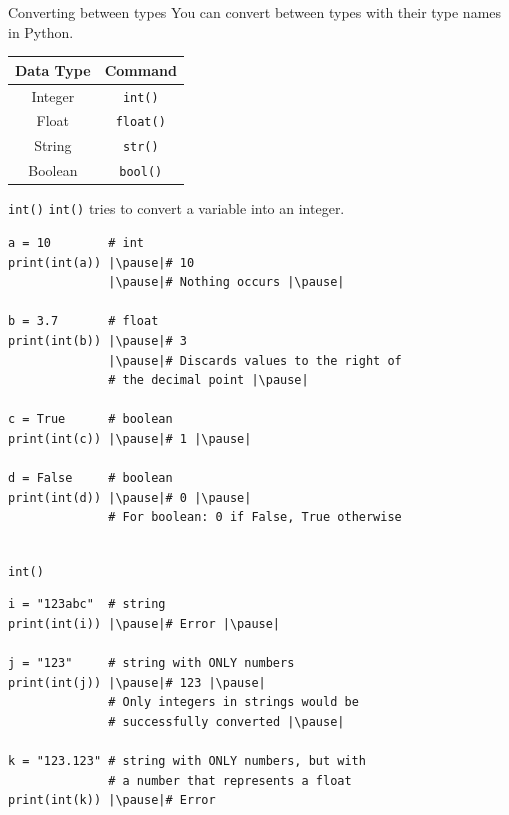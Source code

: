 \documentclass[dvipsnames, svgnames, x11names]{beamer}
\begin{document}
\begin{frame}{Converting between types}
You can convert between types with their type names in Python.
\begin{center}
	\begin{tabular}{|c|c|}\hline
		Data Type & Command\\\hline
		Integer & \texttt{int()}\\\hline
		Float & \texttt{float()}\\\hline
		String & \texttt{str()}\\\hline
		Boolean & \texttt{bool()}\\\hline
	\end{tabular}
\end{center}
\end{frame}

\begin{frame}[fragile]{\texttt{int()}}
\texttt{int()} tries to convert a variable into an integer.
\begin{verbatim} 
a = 10        # int
print(int(a)) |\pause|# 10
			  |\pause|# Nothing occurs |\pause|
			  
b = 3.7       # float
print(int(b)) |\pause|# 3
              |\pause|# Discards values to the right of 
              # the decimal point |\pause|
              
c = True      # boolean
print(int(c)) |\pause|# 1 |\pause|

d = False     # boolean
print(int(d)) |\pause|# 0 |\pause|
              # For boolean: 0 if False, True otherwise
              
\end{verbatim}
\end{frame}

\begin{frame}[fragile]{\texttt{int()}}
\begin{verbatim}
i = "123abc"  # string
print(int(i)) |\pause|# Error |\pause|

j = "123"     # string with ONLY numbers
print(int(j)) |\pause|# 123 |\pause|
              # Only integers in strings would be 
              # successfully converted |\pause|

k = "123.123" # string with ONLY numbers, but with 
              # a number that represents a float
print(int(k)) |\pause|# Error 
\end{verbatim}
\end{frame}
\end{document}
